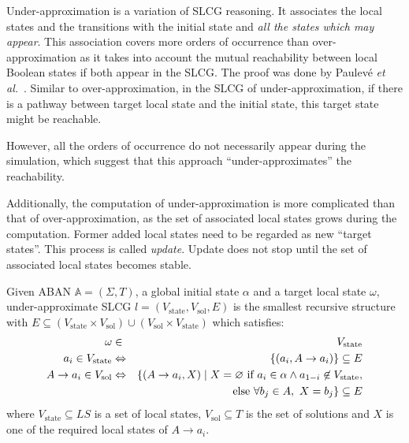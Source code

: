 Under-approximation is a variation of SLCG reasoning. 
It associates the local states and the transitions with the initial state and \textit{all the states which may appear}.
This association covers more orders of occurrence than over-approximation as it takes into account the mutual reachability between local Boolean states if both appear in the SLCG.
The proof was done by Paulev\'e  \textit{et al.}~\cite{pauleve2012}.
Similar to over-approximation, in the SLCG of under-approximation, if there is a pathway between target local state and the initial state, this target state might be reachable.

However, all the orders of occurrence do not necessarily appear during the simulation, which suggest that this approach ``under-approximates'' the reachability.

Additionally, the computation of under-approximation is more complicated than that of over-approximation, as the set of associated local states grows during the computation.
Former added local states need to be regarded as new ``target states''.
This process is called \textit{update}. 
Update does not stop until the set of associated local states becomes stable.


\begin{definition}
Given ABAN $\mathbb{A} = (\Sigma,T)$, a global initial state $\alpha$ and a target local state $\omega$, under-approximate SLCG $l= (V_{\mathrm{state}},V_{\mathrm{sol}},E)$ is the smallest recursive structure with $E \subseteq (V_{\mathrm{state}}\times V_{\mathrm{sol}})\cup (V_{\mathrm{sol}}\times V_{\mathrm{state}})$ which satisfies:
\begin{eqnarray*}
    \omega&\in& V_{\mathrm{state}} \\
    a_i\in V_{\mathrm{state}} &\Leftrightarrow& \{ (a_i, A\to a_i)\}\subseteq E \\
    A\to a_i\in V_{\mathrm{sol}}&\Leftrightarrow& \{ (A\to a_i,X)\mid X= \varnothing \text{ \rm if } a_i\in \alpha\land a_{1-i}\not\in V_{\mathrm{state}},\\
    &&\text{else } \forall b_j\in A,\ X= b_j\}\subseteq E
\end{eqnarray*}
where $V_{\mathrm{state}}\subseteq LS$ is a set of local states, $V_{\mathrm{sol}}\subseteq T$ is the set of solutions and $X$ is one of the required local states of $A\to a_i$. 
\end{definition}

